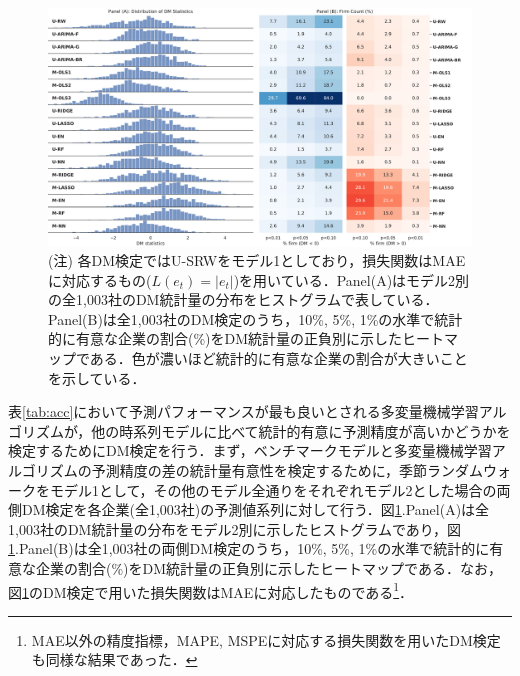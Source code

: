 \documentclass[a4paper，12pt]{jsarticle}
\begin{document}
\begin{figure}[htbp]
  \centering
  \includegraphics[width=15cm]{./img/_dm_MAD_y_hat_srw.pdf}
  \caption{全企業(1,003社)のDM検定結果のまとめ(モデル1: SRW, loss: MAE)}
  \label{fig:dm_srw}
  \caption*{(注) 各DM検定ではU-SRWをモデル1としており，損失関数はMAEに対応するもの($L(e_t)=|e_t|$)を用いている．Panel(A)はモデル2別の全1,003社のDM統計量の分布をヒストグラムで表している．Panel(B)は全1,003社のDM検定のうち，10\%, 5\%, 1\%の水準で統計的に有意な企業の割合(\%)をDM統計量の正負別に示したヒートマップである．色が濃いほど統計的に有意な企業の割合が大きいことを示している．}
\end{figure}

表\ref{tab:acc}において予測パフォーマンスが最も良いとされる多変量機械学習アルゴリズムが，他の時系列モデルに比べて統計的有意に予測精度が高いかどうかを検定するためにDM検定を行う．まず，ベンチマークモデルと多変量機械学習アルゴリズムの予測精度の差の統計量有意性を検定するために，季節ランダムウォークをモデル1として，その他のモデル全通りをそれぞれモデル2とした場合の両側DM検定を各企業(全1,003社)の予測値系列に対して行う．図\ref{fig:dm_srw}.Panel(A)は全1,003社のDM統計量の分布をモデル2別に示したヒストグラムであり，図\ref{fig:dm_srw}.Panel(B)は全1,003社の両側DM検定のうち，10\%, 5\%, 1\%の水準で統計的に有意な企業の割合(\%)をDM統計量の正負別に示したヒートマップである．なお，図\ref{fig:dm_srw}のDM検定で用いた損失関数はMAEに対応したものである\footnote{MAE以外の精度指標，MAPE, MSPEに対応する損失関数を用いたDM検定も同様な結果であった．}．
\end{document}
